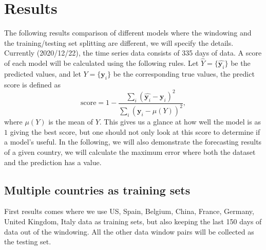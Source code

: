 \documentclass[a4paper,12pt]{article}
\begin{document}
\section{Results}
The following results comparison of different models where the windowing and the training/testing set splitting are different, we will specify the details. Currently (2020/12/22), the time series data consists of 335 days of data. A score of each model will be calculated using the following rules.
Let $\hat{Y} = \{\hat{\mathbf{y}_i}\}$ be the predicted values, and let $Y =\{ \mathbf{y}_i\}$ be the corresponding true values, the predict score is defined as  
\[\text{score}  = 1 - \frac{\sum_i (\hat{\mathbf{y}_i} - \mathbf{y}_i)^2}{\sum_i (\mathbf{y}_i - \mu(Y))^2  },\]
where $\mu(Y)$ is the mean of $Y$. This gives us a glance at how well the model is as $1$ giving the best score, but one should not only look at this score to determine if a model's useful. In the following, we will also demonstrate the forecasting results of a given country, we will calculate the maximum error where both the dataset and the prediction has a value.
\subsection{Multiple countries as training sets}
First results comes where we use US, Spain, Belgium, China, France, Germany, United Kingdom, Italy data as training sets, but also keeping the last 150 days of data out of the windowing. All the other data window pairs will be collected as the testing set. 
\end{document}
